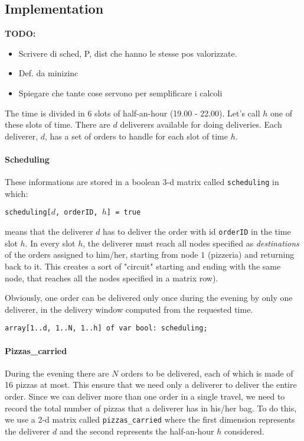 \documentclass[10pt]{article}
\begin{document}
	\subsection{Implementation}


	\textbf{TODO:} 
	\begin{itemize}
		\item Scrivere di sched, P, dist che hanno le stesse pos valorizzate.
		\item Def. da minizinc
		\item Spiegare che tante cose servono per semplificare i calcoli
	\end{itemize}
	
	The time is divided in 6 slots of half-an-hour (19.00 - 22.00). Let's call
	$h$ one of these slots of time.
	There are $d$ deliverers available for doing deliveries.
	Each deliverer, $d$, has a set of orders to handle for each slot of time $h$.

    \paragraph*{Scheduling}
	These informations are stored in a boolean 3-d matrix called 
	\texttt{scheduling} in which: 
	
	\begin{center}
		\texttt{scheduling[$d$, orderID, $h$] = true}
	\end{center}
	
	means that the deliverer $d$ has to deliver the order with id 
	\texttt{orderID} in the time slot $h$. In every slot $h$, the deliverer must 
	reach all nodes specified as \textit{destinations} of the orders assigned to 
	him/her, starting from node $1$ (pizzeria) and returning back to it. This creates
	 a sort of "circuit" starting and ending with the same node, that reaches all the 
	nodes specified in a matrix row).

	Obviously, one order can be delivered only once during the evening by only
	one deliverer, in the delivery window computed from the requested time.

	\begin{center}
		\texttt{array[1..d, 1..N, 1..h] of var bool: scheduling;}
	\end{center}

	\paragraph*{Pizzas\_carried}
	During the evening there are $N$ orders to be delivered, each of which is made of
	16 pizzas at most. This ensure that we need only a deliverer to deliver the 
	entire order.
	Since we can deliver more than one order in a single travel, we need to
	record the total number of pizzas that a deliverer has in his/her bag.
	To do this, we use a 2-d matrix called \texttt{pizzas\_carried} where
	the first dimension represents the deliverer $d$ and the second 
	represents the half-an-hour $h$ considered.
\end{document}
